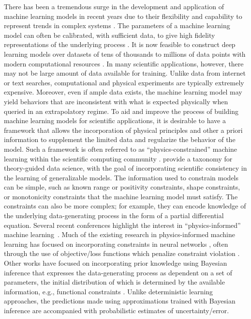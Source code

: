

\label{sec:intro}
There has been a tremendous surge in the development and application of machine learning models in recent years due to their flexibility and capability to represent trends in complex systems .
The parameters of a machine learning model can often be calibrated, with sufficient data, to give high fidelity representations of the underlying process 
.
It is now feasible to construct deep learning models over datasets of tens of thousands to millions of data points with modern computational resources  . In many scientific applications, however, there may not be large amount of data available for training. Unlike data from internet or text searches, computational and physical experiments are typically extremely expensive. Moreover, even if ample data exists, the machine learning model may yield behaviors that are inconsistent with what is expected physically when queried in an extrapolatory regime.
To aid and improve the process of building machine learning models for scientific applications, it is desirable to have a framework that allows the incorporation of physical principles and other a priori information to supplement the limited data and regularize the behavior of the model.  Such a framework is often referred to as ``physics-constrained'' machine learning within the scientific computing community .
 provide a taxonomy for theory-guided data science, 
with the goal of incorporating scientific
consistency in the learning of generalizable models.  The information used to constrain models can be simple, such as known range or positivity constraints, shape constraints, or monotonicity constraints that the machine learning model must satisfy.  The constraints can also be more complex; for example, they can encode knowledge of the underlying data-generating process in the form of a partial differential equation. 
Several recent conferences highlight the interest in ``physics-informed'' machine learning~. 
Much of the existing research in physics-informed machine learning has focused on incorporating constraints in neural networks , often through the use of objective/loss functions which penalize constraint violation . Other works have focused on incorporating prior knowledge using Bayesian inference that expresses the data-generating process as dependent on a set of parameters, the initial distribution of which is determined by the available information, e.g., functional constraints . Unlike deterministic learning approaches, the predictions made using approximations trained with Bayesian inference are accompanied with probabilistic estimates of uncertainty/error.
